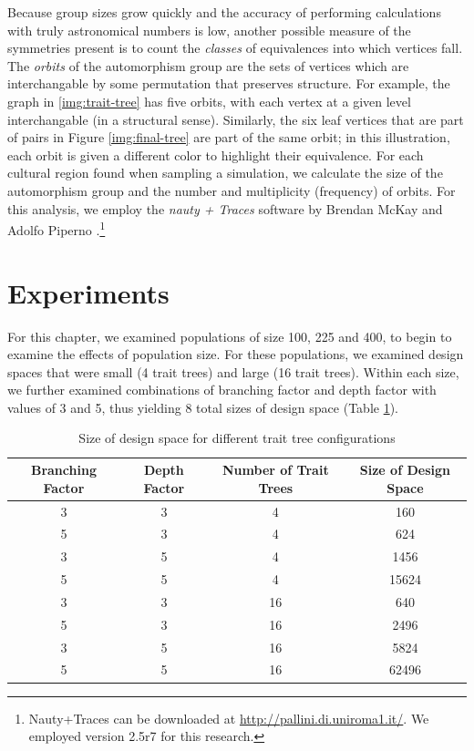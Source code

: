 \documentclass[graybox,natbib]{svmult}
\begin{document}
Because group sizes grow quickly and the accuracy of performing
calculations with truly astronomical numbers is low, another possible
measure of the symmetries present is to count the \emph{classes} of
equivalences into which vertices fall. The \emph{orbits} of the
automorphism group are the sets of vertices which are interchangable by
some permutation that preserves structure. For example, the graph in
\ref{img:trait-tree} has five orbits, with each vertex at a given level
interchangable (in a structural sense). Similarly, the six leaf vertices
that are part of pairs in Figure \ref{img:final-tree} are part of the
same orbit; in this illustration, each orbit is given a different color
to highlight their equivalence. For each cultural region found when
sampling a simulation, we calculate the size of the automorphism group
and the number and multiplicity (frequency) of orbits. For this
analysis, we employ the \emph{nauty + Traces} software by Brendan McKay
and Adolfo Piperno \citep{McKay201494}.\footnote{Nauty+Traces can be
  downloaded at \url{http://pallini.di.uniroma1.it/}. We employed
  version 2.5r7 for this research.}

\section{Experiments}\label{experiments}

For this chapter, we examined populations of size 100, 225 and 400, to
begin to examine the effects of population size. For these populations,
we examined design spaces that were small (4 trait trees) and large (16
trait trees). Within each size, we further examined combinations of
branching factor and depth factor with values of 3 and 5, thus yielding
8 total sizes of design space (Table
\ref{tab:axelrod-design-space-size}).

\begin{table}[H]
\begin{tabular}{|c|c|c|c|}
\hline
\textbf{Branching Factor} & \textbf{Depth Factor} & \textbf{Number of Trait Trees} & \textbf{Size of Design Space}\\ 
\hline
3 & 3 & 4 & 160\\ 
\hline 
5 & 3 & 4 & 624\\ 
\hline 
3 & 5 & 4 & 1456\\ 
\hline 
5 & 5 & 4 & 15624\\ 
\hline 
3 & 3 & 16 & 640\\ 
\hline 
5 & 3 & 16 & 2496\\ 
\hline 
3 & 5 & 16 & 5824\\ 
\hline 
5 & 5 & 16 & 62496\\ 
\hline 
\hline
\end{tabular}
\caption{Size of design space for different trait tree configurations}
\label{tab:axelrod-design-space-size}
\end{table}
\end{document}
